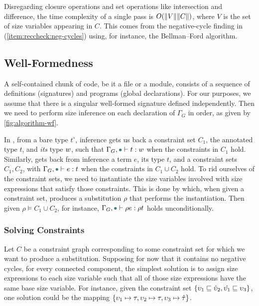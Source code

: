 Disregarding closure operations and set operations like intersection and difference, the time complexity of a single pass is $O(\lVert V\rVert\lVert C\rVert)$, where $V$ is the set of size variables appearing in $C$.
This comes from the negative-cycle finding in (\ref{item:reccheck:neg-cycles}) using, for instance, the Bellman--Ford algorithm.



\subsection{Well-Formedness}\label{sec:algorithm:wf}

A self-contained chunk of code, be it a file or a module, consists of a sequence of \coinductive definitions (signatures) and programs (global declarations).
For our purposes, we assume that there is a singular well-formed signature defined independently.
Then we need to perform size inference on each declaration of $\Gamma_G$ in order,
as given by \autoref{fig:algorithm-wf}.

In , from a bare type $t^\circ$, inference gets us back
a constraint set $C_1$, the annotated type $t$, and \emph{its} type $w$,
such that $\Gamma_G, \mt \vdash t : w$ when the constraints in $C_1$ hold.
Similarly,  gets back from inference a term $e$,
its type $t$, and a constraint sets $C_1, C_2$,
with $\Gamma_G, \mt \vdash e : t$ when the constraints in $C_1 \cup C_2$ hold.
To rid ourselves of the constraint sets, we need to instantiate the size variables involved with size expressions that satisfy those constraints.
This is done by \solve which, when given a constraint set, produces a substitution $\rho$ that performs the instantiation.
Then given $\rho \vDash C_1 \cup C_2$, for instance, $\Gamma_G, \mt \vdash \rho e : \rho t$ holds unconditionally.

\subsubsection{Solving Constraints}

Let $C$ be a constraint graph corresponding to some constraint set for which we want to produce a substitution.
Supposing for now that it contains no negative cycles, for every connected component,
the simplest solution is to assign size expressions to each size variable such that
all of those size expressions have the same base size variable.
For instance, given the constraint set $\{\upsilon_1 \sqsubseteq \hat{\upsilon}_2, \hat{\upsilon_1} \sqsubseteq \upsilon_3\}$,
one solution could be the mapping $\{\upsilon_1 \mapsto \tau, \upsilon_2 \mapsto \tau, \upsilon_3 \mapsto \hat{\tau}\}$.

